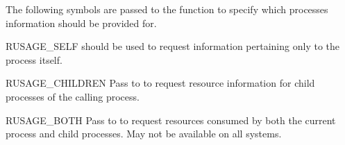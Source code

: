 The following  symbols are passed to the
 function to specify which processes information
should be provided for.

\begin{datadesc}{RUSAGE_SELF}
   should be used to
  request information pertaining only to the process itself.
\end{datadesc}

\begin{datadesc}{RUSAGE_CHILDREN}
  Pass to  to request resource information for
  child processes of the calling process.
\end{datadesc}

\begin{datadesc}{RUSAGE_BOTH}
  Pass to  to request resources consumed by both
  the current process and child processes.  May not be available on all
  systems.
\end{datadesc}
